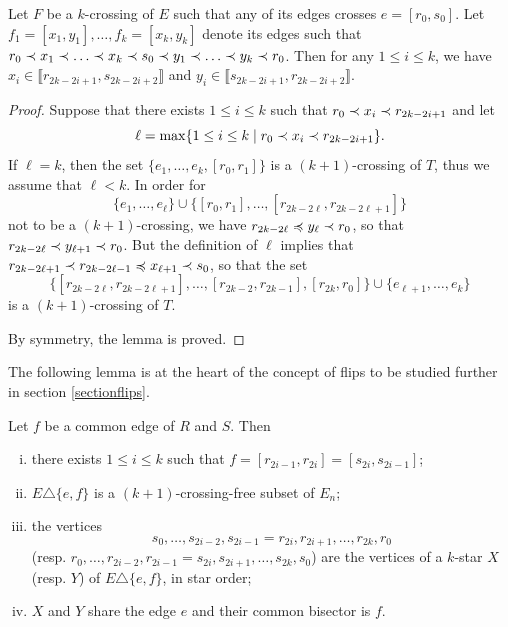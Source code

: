 \documentclass[12pt]{amsart}
\begin{document}
\begin{lemma}\label{sandwich}
Let $F$ be a $k$-crossing of $E$ such that any of its edges crosses $e=[r_0,s_0]$. Let $f_1=[x_1,y_1],\ldots,f_k=[x_k,y_k]$ denote its edges such that $r_0\prec x_1\prec \ldots\prec x_k\prec s_0\prec y_1\prec \ldots\prec y_k\prec r_0$.
Then for any $1\le i\le k$, we have $x_i\in\llbracket r_{2k-2i+1},s_{2k-2i+2}\rrbracket$ and $y_i\in\llbracket s_{2k-2i+1},r_{2k-2i+2}\rrbracket$.
\end{lemma}

\begin{proof}
Suppose that there exists $1\le i\le k$ such that $r_0\prec x_i\prec r_{2k-2i+1}$ and let
$$\ell=\max\{1\le i\le k \;|\; r_0\prec x_i\prec r_{2k-2i+1}\}.$$
If $\ell=k$, then the set $\{e_1,\ldots,e_k,[r_0,r_1]\}$ is a $(k+1)$-crossing of $T$, thus we assume that $\ell<k$. In order for $$\{e_1,\ldots,e_\ell\}\cup\{[r_0,r_1],\ldots,[r_{2k-2\ell},r_{2k-2\ell+1}]\}$$ not to be a $(k+1)$-crossing, we have $r_{2k-2\ell}\preccurlyeq y_\ell\prec r_0$, so that $r_{2k-2\ell}\prec y_{\ell+1}\prec r_0$. But the definition of $\ell$ implies that $r_{2k-2\ell+1}\prec r_{2k-2\ell-1}\preccurlyeq x_{\ell+1}\prec s_0$, so that
the set $$\{[r_{2k-2\ell},r_{2k-2\ell+1}],\ldots,[r_{2k-2},r_{2k-1}],[r_{2k},r_0]\}\cup\{e_{\ell+1},\ldots,e_k\}$$ is a $(k+1)$-crossing of $T$.

By symmetry, the lemma is proved.
\end{proof}

The following lemma is at the heart of the concept of flips to be studied further in section \ref{sectionflips}.

\begin{lemma}\label{commonedge}
Let $f$ be a common edge of $R$ and $S$. Then
\begin{enumerate}[(i)]
\item there exists $1\le i\le k$ such that $f=[r_{2i-1},r_{2i}]=[s_{2i},s_{2i-1}]$;
\item $E\triangle\{e,f\}$ is a $(k+1)$-crossing-free subset of $E_n$;
\item the vertices $$s_0,\ldots,s_{2i-2},s_{2i-1}=r_{2i},r_{2i+1},\ldots,r_{2k},r_0$$
(resp. $r_0,\ldots,r_{2i-2},r_{2i-1}=s_{2i},s_{2i+1},\ldots,s_{2k},s_0$) are the vertices of a $k$-star $X$ (resp. $Y$) of $E\triangle\{e,f\}$, in star order;
\item $X$ and $Y$ share the edge $e$ and their common bisector is $f$.
\end{enumerate}
\end{lemma}
\end{document}
